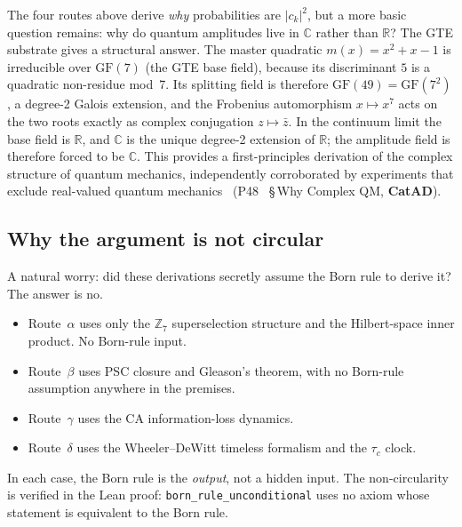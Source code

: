 \documentclass[11pt,a4paper]{article}
\newcommand{\lean}[1]{\texttt{#1}}
\newcommand{\CatAD}{\textbf{CatAD}}
\begin{document}
The four routes above derive \emph{why} probabilities are $|c_k|^2$, but a more
basic question remains: why do quantum amplitudes live in $\mathbb{C}$ rather than
$\mathbb{R}$?  The GTE substrate gives a structural answer.  The master quadratic
$m(x) = x^2 + x - 1$ is irreducible over $\mathrm{GF}(7)$ (the GTE base field),
because its discriminant $5$ is a quadratic non-residue mod~7.  Its splitting field
is therefore $\mathrm{GF}(49) = \mathrm{GF}(7^2)$, a degree-2 Galois extension,
and the Frobenius automorphism $x \mapsto x^7$ acts on the two roots exactly as
complex conjugation $z \mapsto \bar{z}$.  In the continuum limit the base field is
$\mathbb{R}$, and $\mathbb{C}$ is the unique degree-2 extension of $\mathbb{R}$; the
amplitude field is therefore forced to be $\mathbb{C}$.  This provides a first-principles
derivation of the complex structure of quantum mechanics, independently corroborated by
experiments that exclude real-valued quantum mechanics~\cite{Renou2021}
(P48~\cite{SpivackGTECompleteFramework} §\,Why Complex QM, \CatAD).

\subsection{Why the argument is not circular}

A natural worry: did these derivations secretly assume the Born rule to derive it?
The answer is no.

\begin{tcolorbox}[colback=boxyellow,colframe=yellow!70!black,title=Non-circularity]
\begin{itemize}
  \item Route~$\alpha$ uses only the $\mathbb{Z}_7$ superselection structure and the
    Hilbert-space inner product.  No Born-rule input.
  \item Route~$\beta$ uses PSC closure and Gleason's theorem, with no Born-rule
    assumption anywhere in the premises.
  \item Route~$\gamma$ uses the CA information-loss dynamics.
  \item Route~$\delta$ uses the Wheeler--DeWitt timeless formalism and the $\tau_c$ clock.
\end{itemize}
In each case, the Born rule is the \emph{output}, not a hidden input.
The non-circularity is verified in the Lean proof:
\lean{born\_rule\_unconditional} uses no axiom whose statement is equivalent to
the Born rule.
\end{tcolorbox}
\end{document}
